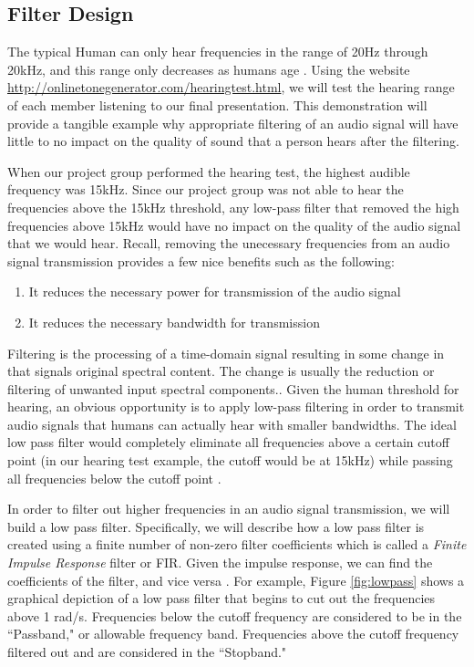 \subsection{Filter Design}

The typical Human can only hear frequencies in the range of 20Hz through 20kHz, and this range only decreases as humans age  \cite{human:rg}.  Using the website \url{http://onlinetonegenerator.com/hearingtest.html}, we will test the hearing range of each member listening to our final presentation.  This demonstration will provide a tangible example why appropriate filtering of an audio signal will have little to no impact on the quality of sound that a person hears after the filtering.  

When our project group performed the hearing test, the highest audible frequency was 15kHz.  Since our project group was not able to hear the frequencies above the 15kHz threshold, any low-pass filter that removed the high frequencies above 15kHz would have no impact on the quality of the audio signal that  we would hear.  Recall, removing the unecessary frequencies from an audio signal transmission provides a few nice benefits such as the following: 

\begin{enumerate}
\item It reduces the necessary power for transmission of the audio signal
\item It reduces the necessary bandwidth for transmission
\end{enumerate}

Filtering is the processing of a time-domain signal resulting in some change in that signals original spectral content.  The change is usually the reduction or filtering of unwanted input spectral components.\cite{lyons:intro}.  Given the human threshold for hearing, an obvious opportunity is to apply low-pass filtering in order to transmit audio signals that humans can actually hear with smaller bandwidths.  The ideal low pass filter would completely eliminate all frequencies above a certain cutoff point (in our hearing test example, the cutoff would be at 15kHz) while passing all frequencies below the cutoff point \cite{lowpass:wiki}.       

In order to filter out higher frequencies in an audio signal transmission, we will build a low pass filter.  Specifically, we will describe how a low pass filter is created using a finite number of non-zero filter coefficients which is called a \textit{Finite Impulse Response} filter or FIR.  Given the impulse response, we can find the coefficients of the filter, and vice versa \cite{notes:class}.  For example, Figure \ref{fig:lowpass} shows a graphical depiction of a low pass filter that begins to cut out the frequencies above 1 rad/s.  Frequencies below the cutoff frequency are considered to be in the ``Passband," or allowable frequency band.  Frequencies above the cutoff frequency filtered out and are considered in the ``Stopband."  

